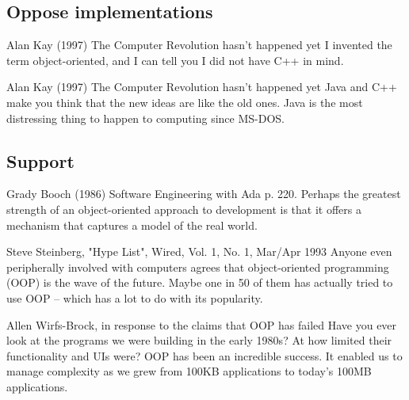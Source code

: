 \documentclass[12pt]{book}
\begin{document}

\subsection{Oppose implementations}

\begin{kodequote}{Alan Kay (1997) The Computer Revolution hasn't happened yet}
	I invented the term object-oriented, and I can tell you I did not have C++ in mind.
\end{kodequote}

\begin{kodequote}{Alan Kay (1997) The Computer Revolution hasn't happened yet}
	Java and C++ make you think that the new ideas are like the old ones. Java is the most distressing thing to happen to computing since MS-DOS.
\end{kodequote}

\subsection{Support}

\begin{kodequote}{Grady Booch (1986) Software Engineering with Ada p. 220. }
	Perhaps the greatest strength of an object-oriented approach to development is that it offers a mechanism that captures a model of the real world.
\end{kodequote}


\begin{kodequote}{Steve Steinberg, "Hype List", Wired, Vol. 1, No. 1, Mar/Apr 1993}
	Anyone even peripherally involved with computers agrees that object-oriented programming (OOP) is the wave of the future. Maybe one in 50 of them has actually tried to use OOP – which has a lot to do with its popularity.
\end{kodequote}

\begin{kodequote}{Allen Wirfs-Brock, in response to the claims that OOP has failed}
	Have you ever look at the programs we were building in the early 1980s? At how limited their functionality and UIs were? OOP has been an incredible success. It enabled us to manage complexity as we grew from 100KB applications to today’s 100MB applications.
\end{kodequote}
\end{document}
